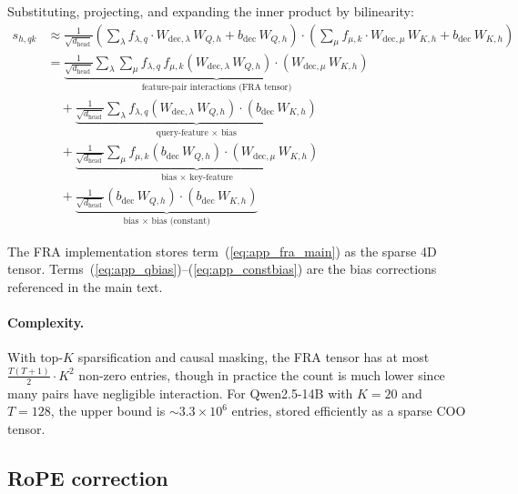 \documentclass{article}
\theoremstyle{plain}
\theoremstyle{definition}
\theoremstyle{remark}
\newcommand{\dhead}{d_{\mathrm{head}}}
\begin{document}
Substituting, projecting, and expanding the inner product by bilinearity:
\begin{align}
    s_{h,qk} &\approx \frac{1}{\sqrt{\dhead}} \left( \sum_\lambda f_{\lambda,q} \cdot W_{\mathrm{dec},\lambda}\,W_{Q,h} + b_{\mathrm{dec}}\,W_{Q,h} \right) \cdot \left( \sum_\mu f_{\mu,k} \cdot W_{\mathrm{dec},\mu}\,W_{K,h} + b_{\mathrm{dec}}\,W_{K,h} \right) \\
    &= \underbrace{\frac{1}{\sqrt{\dhead}} \sum_\lambda \sum_\mu f_{\lambda,q} \, f_{\mu,k} \left( W_{\mathrm{dec},\lambda}\,W_{Q,h} \right) \cdot \left( W_{\mathrm{dec},\mu}\,W_{K,h} \right)}_{\text{feature-pair interactions (FRA tensor)}} \label{eq:app_fra_main} \\
    &\quad + \underbrace{\frac{1}{\sqrt{\dhead}} \sum_\lambda f_{\lambda,q} \left( W_{\mathrm{dec},\lambda}\,W_{Q,h} \right) \cdot \left( b_{\mathrm{dec}}\,W_{K,h} \right)}_{\text{query-feature $\times$ bias}} \label{eq:app_qbias} \\
    &\quad + \underbrace{\frac{1}{\sqrt{\dhead}} \sum_\mu f_{\mu,k} \left( b_{\mathrm{dec}}\,W_{Q,h} \right) \cdot \left( W_{\mathrm{dec},\mu}\,W_{K,h} \right)}_{\text{bias $\times$ key-feature}} \label{eq:app_kbias} \\
    &\quad + \underbrace{\frac{1}{\sqrt{\dhead}} \left( b_{\mathrm{dec}}\,W_{Q,h} \right) \cdot \left( b_{\mathrm{dec}}\,W_{K,h} \right)}_{\text{bias $\times$ bias (constant)}} \label{eq:app_constbias}
\end{align}

The FRA implementation stores term~(\ref{eq:app_fra_main}) as the sparse 4D tensor. Terms~(\ref{eq:app_qbias})--(\ref{eq:app_constbias}) are the bias corrections referenced in the main text.

\paragraph{Complexity.} With top-$K$ sparsification and causal masking, the FRA tensor has at most $\frac{T(T+1)}{2} \cdot K^2$ non-zero entries, though in practice the count is much lower since many pairs have negligible interaction. For Qwen2.5-14B with $K{=}20$ and $T{=}128$, the upper bound is ${\sim}3.3 \times 10^6$ entries, stored efficiently as a sparse COO tensor.

\subsection{RoPE correction}
\label{app:rope}
\end{document}
